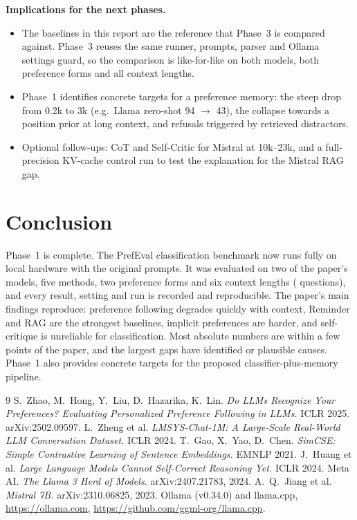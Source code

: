 \documentclass[11pt,a4paper]{article}
\begin{document}
\noindent\textbf{Implications for the next phases.}
\begin{itemize}
  \item The baselines in this report are the reference that Phase~3 is compared against. Phase~3 reuses the same runner, prompts, parser
        and Ollama settings guard, so the comparison is like-for-like on both models, both preference forms and all context lengths.
  \item Phase~1 identifies concrete targets for a preference memory: the steep drop from 0.2k to 3k (e.g.\ Llama zero-shot 94 $\rightarrow$
        43), the collapse towards a position prior at long context, and refusals triggered by retrieved distractors.
  \item Optional follow-ups: CoT and Self-Critic for Mistral at 10k--23k, and a full-precision KV-cache control run to test the
        explanation for the Mistral RAG gap.
\end{itemize}

\section{Conclusion}
Phase~1 is complete. The PrefEval classification benchmark now runs fully on local hardware with the original prompts. It was
evaluated on two of the paper's models, five methods, two preference forms and six context lengths (\nQuestions{} questions),
and every result, setting and run is recorded and reproducible. The paper's main findings reproduce: preference following degrades
quickly with context, Reminder and RAG are the strongest baselines, implicit preferences are harder, and self-critique is
unreliable for classification. Most absolute numbers are within a few points of the paper, and the largest gaps have identified or
plausible causes. Phase~1 also provides concrete targets for the proposed classifier-plus-memory pipeline.

\begin{thebibliography}{9}\small
{} S.~Zhao, M.~Hong, Y.~Liu, D.~Hazarika, K.~Lin.
  \emph{Do LLMs Recognize Your Preferences? Evaluating Personalized Preference Following in LLMs.} ICLR 2025. arXiv:2502.09597.
 L.~Zheng et al. \emph{LMSYS-Chat-1M: A Large-Scale Real-World LLM Conversation Dataset.} ICLR 2024.
 T.~Gao, X.~Yao, D.~Chen. \emph{SimCSE: Simple Contrastive Learning of Sentence Embeddings.} EMNLP 2021.
 J.~Huang et al. \emph{Large Language Models Cannot Self-Correct Reasoning Yet.} ICLR 2024.
 Meta AI. \emph{The Llama 3 Herd of Models.} arXiv:2407.21783, 2024.
 A.~Q.~Jiang et al. \emph{Mistral 7B.} arXiv:2310.06825, 2023.
 Ollama (v0.34.0) and llama.cpp, \url{https://ollama.com}, \url{https://github.com/ggml-org/llama.cpp}.
\end{thebibliography}
\end{document}
